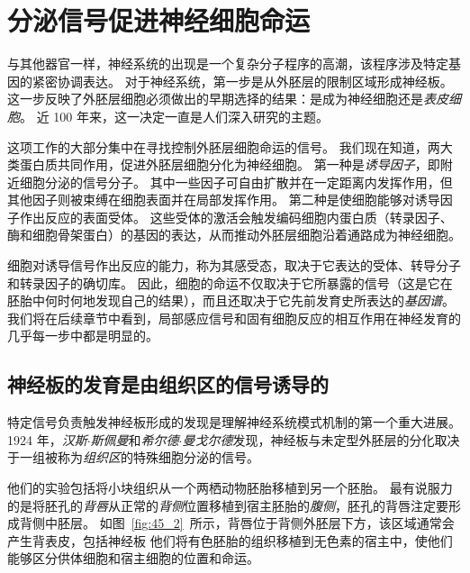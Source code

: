\section{分泌信号促进神经细胞命运}

与其他器官一样，神经系统的出现是一个复杂分子程序的高潮，该程序涉及特定基因的紧密协调表达。
对于神经系统，第一步是从外胚层的限制区域形成神经板。
这一步反映了外胚层细胞必须做出的早期选择的结果：是成为神经细胞还是\textit{表皮细胞}。
近 100 年来，这一决定一直是人们深入研究的主题。


这项工作的大部分集中在寻找控制外胚层细胞命运的信号。
我们现在知道，两大类蛋白质共同作用，促进外胚层细胞分化为神经细胞。
第一种是\textit{诱导因子}，即附近细胞分泌的信号分子。
其中一些因子可自由扩散并在一定距离内发挥作用，但其他因子则被束缚在细胞表面并在局部发挥作用。
第二种是使细胞能够对诱导因子作出反应的表面受体。
这些受体的激活会触发编码细胞内蛋白质（转录因子、酶和细胞骨架蛋白）的基因的表达，从而推动外胚层细胞沿着通路成为神经细胞。


细胞对诱导信号作出反应的能力，称为其感受态，取决于它表达的受体、转导分子和转录因子的确切库。
因此，细胞的命运不仅取决于它所暴露的信号（这是它在胚胎中何时何地发现自己的结果），而且还取决于它先前发育史所表达的\textit{基因谱}。
我们将在后续章节中看到，局部感应信号和固有细胞反应的相互作用在神经发育的几乎每一步中都是明显的。



\subsection{神经板的发育是由组织区的信号诱导的}

特定信号负责触发神经板形成的发现是理解神经系统模式机制的第一个重大进展。
1924 年，\textit{汉斯$\cdot$斯佩曼}和\textit{希尔德$\cdot$曼戈尔德}发现，神经板与未定型外胚层的分化取决于一组被称为\textit{组织区}的特殊细胞分泌的信号。


他们的实验包括将小块组织从一个两栖动物胚胎移植到另一个胚胎。
最有说服力的是将胚孔的\textit{背唇}从正常的\textit{背侧}位置移植到宿主胚胎的\textit{腹侧}，胚孔的背唇注定要形成背侧中胚层。
如图~\ref{fig:45_2}~所示，背唇位于背侧外胚层下方，该区域通常会产生背表皮，包括神经板
他们将有色胚胎的组织移植到无色素的宿主中，使他们能够区分供体细胞和宿主细胞的位置和命运。



